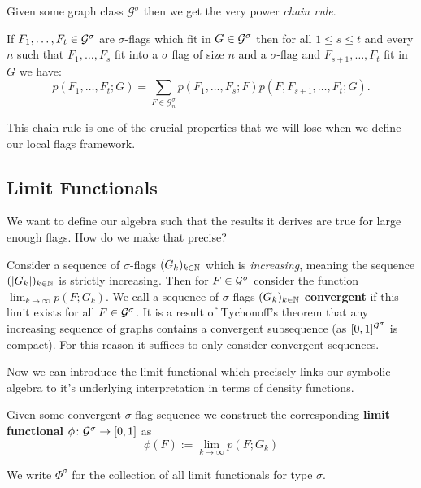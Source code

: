 Given some graph class $\mathcal{G}^\sigma$ then we get the very power \textit{chain rule}.
\begin{lemma}
    \label{lemma:chain_rule}
    If $F_1, \dots, F_t \in \mathcal{G}^\sigma$ are $\sigma$-flags which fit in $G\in\mathcal{G}^\sigma$
    then for all $1 \leq s \leq t$ and every $n$ such that
    $F_1, \dots, F_s$ fit into a $\sigma$ flag of size $n$ and a
    $\sigma$-flag and $F_{s+1}, \dots, F_t$ fit in $G$ we have:
    \[
    p(F_1, \dots, F_t; G) = \sum_{F \in \mathcal{G}^\sigma_n}
    p(F_1, \dots, F_s; F)p(F, F_{s+1}, \dots, F_t; G).
    \]
\end{lemma}

This chain rule is one of the crucial properties that we will lose when we define our
local flags framework.

\subsection{Limit Functionals}
\label{sec:limit_functionals}

We want to define our algebra such that the results it derives are true for large enough
flags. How do we make that precise?

Consider a sequence of $\sigma$-flags $(G_k)_{k\in\mathbb{N}}$ which is \textit{increasing}, meaning
the sequence $(|G_k|)_{k\in\mathbb{N}}$ is strictly increasing. Then for $F\in\mathcal{G}^\sigma$
consider the function $\lim_{k\to\infty} p(F; G_k)$. We call a sequence of $\sigma$-flags
$(G_k)_{k\in\mathbb{N}}$ \textbf{convergent} if this limit exists for all $F\in\mathcal{G}^\sigma$.
It is a result of Tychonoff's theorem that any increasing sequence of graphs contains a convergent
subsequence (as $[0,1]^{\mathcal{G}^\sigma}$ is compact). For this reason it suffices to only
consider convergent sequences.

Now we can introduce the limit functional which precisely links our symbolic algebra
to it's underlying interpretation in terms of density functions.

\begin{definition}
    Given some convergent $\sigma$-flag sequence we construct the corresponding
    \textbf{limit functional} $\phi\colon \mathcal{G}^\sigma \to [0,1]$
    as
    \[
        \phi(F) := \lim_{k \to \infty} p(F; G_k)
    \]
\end{definition}

We write $\Phi^\sigma$ for the collection of all limit functionals for type $\sigma$.

